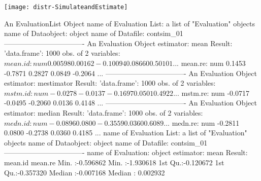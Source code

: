 \documentclass[11pt]{article}
\begin{document}
\texttt{[image: distr-SimulateandEstimate]}
\begin{Schunk}
\begin{Soutput}
An EvaluationList Object
name of Evaluation List: a list of "Evaluation" objects
name of Dataobject: object
name of Datafile: contsim_01
----------------------------------
An Evaluation Object
estimator: mean
Result: 'data.frame':	1000 obs. of  2 variables:
 $ mean.id: num   0.00598  0.00162 -0.10094  0.08660  0.50101 ...
 $ mean.re: num   0.1453 -0.7871  0.2827  0.0849 -0.2064 ...
----------------------------------
An Evaluation Object
estimator: mestimator
Result: 'data.frame':	1000 obs. of  2 variables:
 $ mstm.id: num  -0.0278 -0.0137 -0.1697  0.0501  0.4922 ...
 $ mstm.re: num  -0.0717 -0.0495 -0.2060  0.0136  0.4148 ...
----------------------------------
An Evaluation Object
estimator: median
Result: 'data.frame':	1000 obs. of  2 variables:
 $ medn.id: num  -0.0896  0.0800 -0.3559  0.0360  0.6089 ...
 $ medn.re: num  -0.2811  0.0800 -0.2738  0.0360  0.4185 ...
name of Evaluation List: a list of "Evaluation" objects
name of Dataobject: object
name of Datafile: contsim_01
----------------------------------
name of Evaluation: object
estimator: mean
Result:
    mean.id             mean.re
 Min.   :-0.596862   Min.   :-1.930618
 1st Qu.:-0.120672   1st Qu.:-0.357320
 Median :-0.007168   Median : 0.002932

\end{Soutput}
\end{Schunk}
\end{document}
